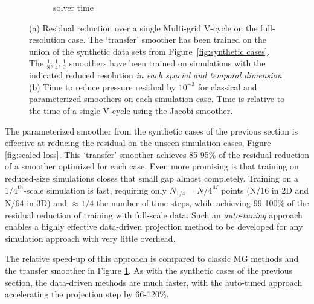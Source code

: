 \documentclass[review]{elsarticle}
\begin{document}
\begin{figure}
\begin{subfigure}[b]{0.47\textwidth}
        \caption{solver time}
        \label{fig:simulation time}
    \end{subfigure}
        \caption{(a) Residual reduction over a single Multi-grid V-cycle on the full-resolution case. The `transfer' smoother has been trained on the union of the synthetic data sets from Figure~\ref{fig:synthetic cases}. The $\frac 18, \frac 14, \frac 12$ smoothers have been trained on simulations with the indicated reduced resolution \textit{in each spacial and temporal dimension}. (b) Time to reduce pressure residual by $10^{-3}$ for classical and parameterized smoothers on each simulation case. Time is relative to the time of a single V-cycle using the Jacobi smoother.}
        \label{fig:tuned simulation}
\end{figure}

The parameterized smoother from the synthetic cases of the previous section is effective at reducing the residual on the unseen simulation cases, Figure \ref{fig:scaled loss}. This `transfer' smoother achieves 85-95\% of the residual reduction of a smoother optimized for each case. Even more promising is that training on reduced-size simulations closes that small gap almost completely. Training on a $1/4^\text{th}$-scale simulation is fast, requiring only $N_{1/4} = N/4^M$ points (N/16 in 2D and N/64 in 3D) and $\approx 1/4$ the number of time steps, while achieving 99-100\% of the residual reduction of training with full-scale data. Such an \textit{auto-tuning} approach enables a highly effective data-driven projection method to be developed for any simulation approach with very little overhead.

The relative speed-up of this approach is compared to classic MG methods and the transfer smoother in Figure \ref{fig:simulation time}. As with the synthetic cases of the previous section, the data-driven methods are much faster, with the auto-tuned approach accelerating the projection step by 66-120\%.
\end{document}
